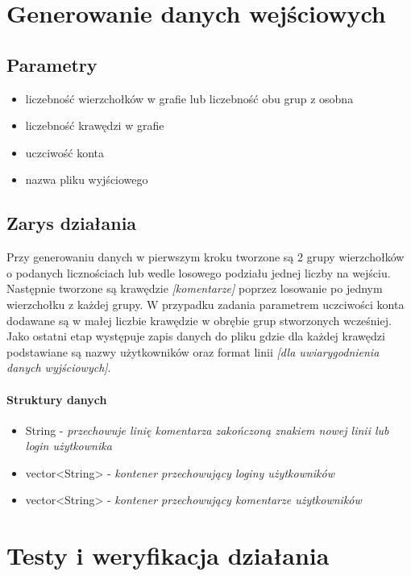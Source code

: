\documentclass[11pt]{article}
\newcommand{\+}{\discretionary{\mbox{\scriptsize$\hookleftarrow$}}{}{}}
\begin{document}
\section{Generowanie danych wejściowych}
\subsection{Parametry}
\begin{itemize}
\item
liczebność wierzchołków w grafie lub liczebność obu grup z osobna
\item
liczebność krawędzi w grafie
\item
uczciwość konta
\item
nazwa pliku wyjściowego
\end{itemize}
\subsection{Zarys działania}
  Przy generowaniu danych w pierwszym kroku tworzone są 2 grupy wierzchołków o podanych licznościach lub wedle losowego podziału jednej liczby na wejściu. Następnie tworzone są krawędzie \textsl{[komentarze]} poprzez losowanie po jednym wierzchołku z każdej grupy. W przypadku zadania parametrem uczciwości konta dodawane są w małej liczbie krawędzie w obrębie grup stworzonych wcześniej. Jako ostatni etap występuje zapis danych do pliku gdzie dla każdej krawędzi podstawiane są nazwy użytkowników oraz format linii \textsl{[dla uwiarygodnienia danych wyjściowych]}.\\
\paragraph{Struktury danych}
\begin{itemize}
	\item 
  String - \textsl{przechowuje linię komentarza zakończoną znakiem nowej linii lub login użytkownika}
 	\item
  vector<String> - \textsl{kontener przechowujący loginy użytkowników}
  	\item 
  vector<String> - \textsl{kontener przechowujący komentarze użytkowników}

\end{itemize}
\section{Testy i weryfikacja działania}
\end{document}
